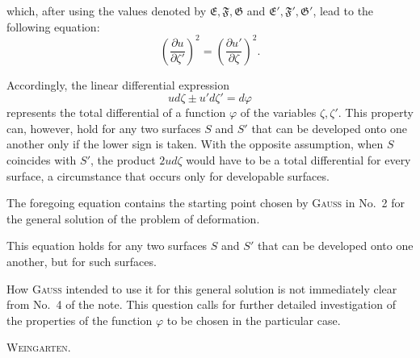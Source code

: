 %
\noindent which, after using the values denoted by $\mathfrak{E},\mathfrak{F},\mathfrak{G}$ and $\mathfrak{E}',\mathfrak{F}',\mathfrak{G}'$, lead to the following equation:
\[
\left(\frac{\partial u}{\partial\zeta'}\right)^2=\left(\frac{\partial u'}{\partial\zeta}\right)^2.
\]

\noindent Accordingly, the linear differential expression
\[
ud\zeta\pm u'd\zeta'=d\varphi
\]
\noindent represents the total differential of a function $\varphi$ of the variables $\zeta,\zeta'$. This property can, however, hold for any two surfaces $S$ and $S'$ that can be developed onto one another only if the lower sign is taken. With the opposite assumption, when $S$ coincides with $S'$, the product $2ud\zeta$ would have to be a total differential for every surface, a circumstance that occurs only for developable surfaces.

The foregoing equation contains the starting point chosen by \textsc{Gauss} in No.\ 2 for the general solution of the problem of deformation.

This equation holds for any two surfaces $S$ and $S'$ that can be developed onto one another, but  for such surfaces.

How \textsc{Gauss} intended to use it for this general solution is not immediately clear from No.\ 4 of the note. This question calls for further detailed investigation of the properties of the function $\varphi$ to be chosen in the particular case.
\begin{flushright}\textsc{Weingarten}.\end{flushright}

